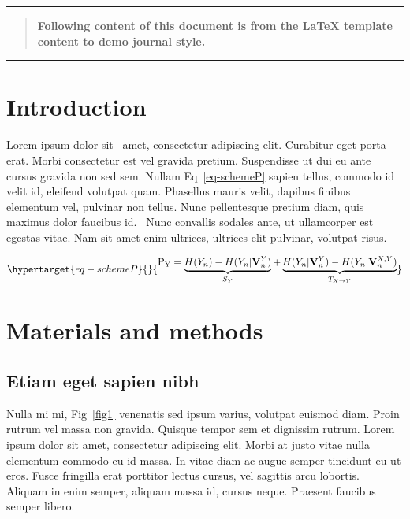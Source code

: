 \documentclass[
  10pt,
  letterpaper,
]{article}
\begin{document}
\begin{center}\rule{0.5\linewidth}{0.5pt}\end{center}

\begin{quote}
\textbf{Following content of this document is from the LaTeX template
content to demo journal style.}
\end{quote}

\begin{center}\rule{0.5\linewidth}{0.5pt}\end{center}

\hypertarget{introduction-1}{%
\section{Introduction}\label{introduction-1}}

Lorem ipsum dolor sit~\citep{bib1} amet, consectetur adipiscing elit.
Curabitur eget porta erat. Morbi consectetur est vel gravida pretium.
Suspendisse ut dui eu ante cursus gravida non sed sem. Nullam
Eq~\ref{eq-schemeP} sapien tellus, commodo id velit id, eleifend
volutpat quam. Phasellus mauris velit, dapibus finibus elementum vel,
pulvinar non tellus. Nunc pellentesque pretium diam, quis maximus dolor
faucibus id.~\citep{bib2} Nunc convallis sodales ante, ut ullamcorper
est egestas vitae. Nam sit amet enim ultrices, ultrices elit pulvinar,
volutpat risus.

\begin{equation}\protect\hypertarget{eq-schemeP}{}{
\begin{aligned}
\mathrm{P_Y} = \underbrace{H(Y_n) - H(Y_n|\mathbf{V}^{Y}_{n})}_{S_Y} + \underbrace{H(Y_n|\mathbf{V}^{Y}_{n})- H(Y_n|\mathbf{V}^{X,Y}_{n})}_{T_{X\rightarrow Y}}
\end{aligned}
}\label{eq-schemeP}\end{equation}

\hypertarget{materials-and-methods}{%
\section{Materials and methods}\label{materials-and-methods}}

\hypertarget{etiam-eget-sapien-nibh}{%
\subsection{Etiam eget sapien nibh}\label{etiam-eget-sapien-nibh}}

Nulla mi mi, Fig~\ref{fig1} venenatis sed ipsum varius, volutpat euismod
diam. Proin rutrum vel massa non gravida. Quisque tempor sem et
dignissim rutrum. Lorem ipsum dolor sit amet, consectetur adipiscing
elit. Morbi at justo vitae nulla elementum commodo eu id massa. In vitae
diam ac augue semper tincidunt eu ut eros. Fusce fringilla erat
porttitor lectus cursus, vel sagittis arcu lobortis. Aliquam in enim
semper, aliquam massa id, cursus neque. Praesent faucibus semper libero.
\end{document}
